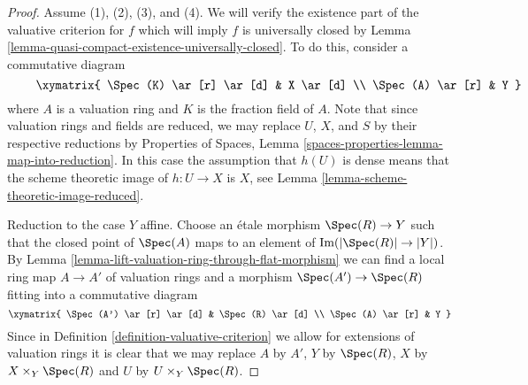 \begin{proof}
Assume (1), (2), (3), and (4).
We will verify the existence part of the valuative criterion for $f$
which will imply $f$ is universally closed by
Lemma \ref{lemma-quasi-compact-existence-universally-closed}.
To do this, consider a commutative diagram
\begin{equation}
\label{equation-start-with}
\vcenter{
\xymatrix{
\Spec(K) \ar[r] \ar[d] & X \ar[d] \\
\Spec(A) \ar[r] & Y
}
}
\end{equation}
where $A$ is a valuation ring and $K$ is the fraction field of $A$.
Note that since valuation rings and fields are reduced, we may
replace $U$, $X$, and $S$ by their respective reductions by
Properties of Spaces, Lemma \ref{spaces-properties-lemma-map-into-reduction}.
In this case the assumption that $h(U)$ is dense means that
the scheme theoretic image of $h : U \to X$ is $X$, see
Lemma \ref{lemma-scheme-theoretic-image-reduced}.

\medskip\noindent
Reduction to the case $Y$ affine. Choose an \'etale morphism
$\Spec(R) \to Y$ such that the closed point of $\Spec(A)$ maps
to an element of $\text{Im}(|\Spec(R)| \to |Y|)$. By
Lemma \ref{lemma-lift-valuation-ring-through-flat-morphism}
we can find a local ring map $A \to A'$ of valuation rings
and a morphism $\Spec(A') \to \Spec(R)$ fitting into a commutative
diagram
$$
\xymatrix{
\Spec(A') \ar[r] \ar[d] & \Spec(R) \ar[d] \\
\Spec(A) \ar[r] & Y
}
$$
Since in Definition \ref{definition-valuative-criterion}
we allow for extensions of valuation rings
it is clear that we may replace $A$ by $A'$, $Y$ by $\Spec(R)$,
$X$ by $X \times_Y \Spec(R)$ and $U$ by $U \times_Y \Spec(R)$.


\end{proof}
